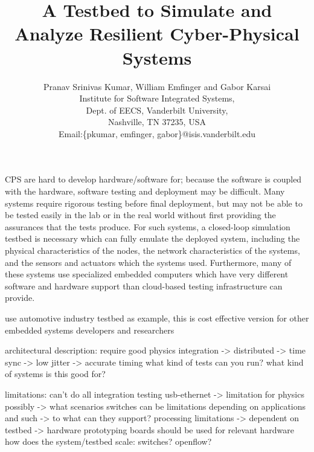 \documentclass[conference]{IEEEtran}
\begin{document}
%
\title{A Testbed to Simulate and Analyze Resilient Cyber-Physical Systems}


\author{ Pranav Srinivas Kumar, William Emfinger and Gabor Karsai \\
Institute for Software Integrated Systems,\\ Dept. of EECS, Vanderbilt University,\\
Nashville, TN 37235, USA \\
Email:\{pkumar, emfinger, gabor\}@isis.vanderbilt.edu}


\maketitle




CPS are hard to develop hardware/software for; because the software is coupled with the hardware, software testing and deployment may be difficult.  Many systems require rigorous testing before final deployment, but may not be able to be tested easily in the lab or in the real world without first providing the assurances that the tests produce.  For such systems, a closed-loop simulation testbed is necessary which can fully emulate the deployed system, including the physical characteristics of the nodes, the network characteristics of the systems, and the sensors and actuators which the systems used.  Furthermore, many of these systems use specialized embedded computers which have very different software and hardware support than cloud-based testing infrastructure can provide.  

use automotive industry testbed as example, this is cost effective version for other embedded systems developers and researchers

architectural description:
require good physics integration -> distributed -> time sync -> low jitter -> accurate timing
what kind of tests can you run?
what kind of systems is this good for?

limitations:
can't do all integration testing
usb-ethernet -> limitation for physics possibly -> what scenarios
switches can be limitations depending on applications and such -> to what can they support?
processing limitations -> dependent on testbed -> hardware prototyping boards should be used for relevant hardware
how does the system/testbed scale: switches? openflow?
\end{document}
